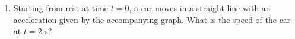\documentclass[12pt,letterpaper]{article}
\begin{document}
\begin{enumerate}


\item
Starting from rest at time $t = 0$, a car moves in a straight line with an acceleration given by the accompanying graph. What is the speed of the car at $t = 2$ s?

\begin{tabular}{l r}


\end{tabular}
\end{enumerate}
\end{document}
